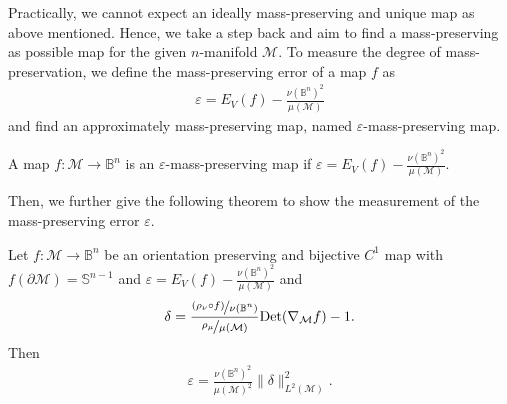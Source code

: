 \documentclass{article}
\begin{document}
Practically, we cannot expect an ideally mass-preserving and unique map as above mentioned. Hence, we take a step back and aim to find a mass-preserving as possible map for the given $n$-manifold $\mathcal{M}$. To measure the degree of mass-preservation, we define the mass-preserving error of a map $f$ as
\begin{align}
    \varepsilon = E_V(f) - \frac{\nu(\mathbb{B}^n)^2}{\mu(\mathcal{M})}
\end{align}
and find an approximately mass-preserving map, named $\varepsilon$-mass-preserving map.
\begin{definition}
    A map $f:\mathcal{M} \to \mathbb{B}^n$ is an $\varepsilon$-mass-preserving map if $\varepsilon = E_V(f) - \frac{\nu(\mathbb{B}^n)^2}{\mu(\mathcal{M})}$.
\end{definition}
Then, we further give the following theorem to show the measurement of the mass-preserving error $\varepsilon$.

\begin{theorem} \label{thm:epsilon_continue}
    Let $f:\mathcal{M}\to \mathbb{B}^n$ be an orientation preserving and bijective $C^1$ map with $f(\partial \mathcal{M}) = \mathbb{S}^{n-1}$ and $\varepsilon = E_V(f) - \frac{\nu(\mathbb{B}^n)^2}{\mu(\mathcal{M})}$ and
    \begin{align}
        \delta = \frac{\nicefrac{(\rho_\nu \circ f)}{\nu(\mathbb{B}^n)}}{\nicefrac{\rho_\mu}{\mu(\mathcal{M})}} {\rm Det}(\nabla_{\mathcal{M}} f) - 1.
    \end{align}
    Then
    \begin{align}
        \varepsilon = \frac{\nu(\mathbb{B}^n)^2}{\mu(\mathcal{M})^2} \|\delta\|_{L^2(\mathcal{M})}^2. \label{ineq:epsilon_continue}
    \end{align}
\end{theorem}
\end{document}
